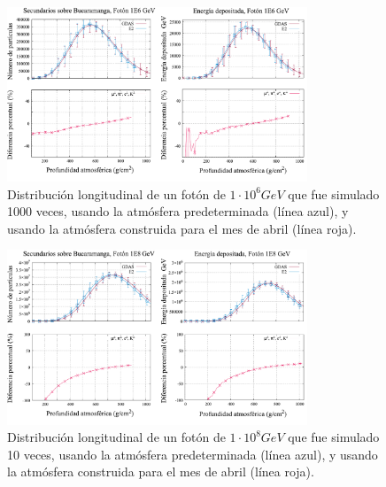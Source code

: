 \begin{figure}[htb!]
\centering
\includegraphics[width=0.8\textwidth]{Figs/foton_1E6.pdf}
\caption[Distribución longitudinal de un fotón de $1\cdot 10^{6}$ GeV.]{Distribución longitudinal de un fotón de $1\cdot 10^{6} GeV$ que fue simulado 1000 veces, usando la atmósfera predeterminada (línea azul), y usando la atmósfera construida para el mes de abril (línea roja). }
\label{fig:fig31}
\end{figure}

\begin{figure}[htb!]
\centering
\includegraphics[width=0.8\textwidth]{Figs/foton_1E8.pdf}
\caption[Distribución longitudinal de un fotón de $1\cdot 10^{8}$ GeV.]{Distribución longitudinal de un fotón de $1\cdot 10^{8} GeV$ que fue simulado 10 veces, usando la atmósfera predeterminada (línea azul), y usando la atmósfera construida para el mes de abril (línea roja). }
\label{fig:fig32}
\end{figure}





